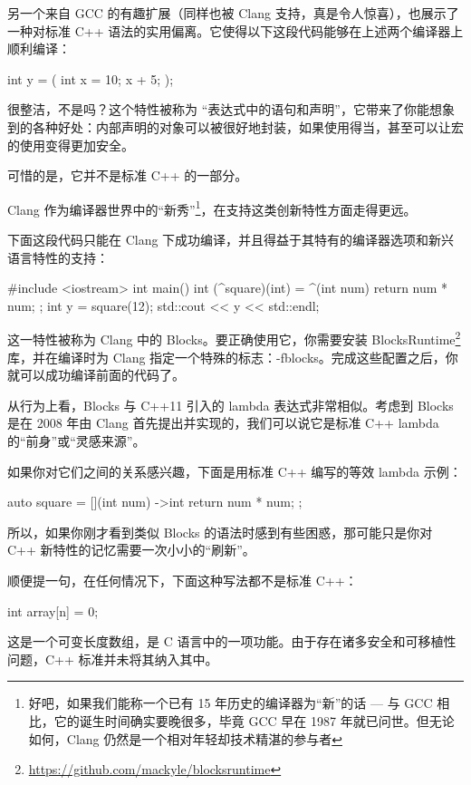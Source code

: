 另一个来自 GCC 的有趣扩展（同样也被 Clang 支持，真是令人惊喜），也展示了一种对标准 C++ 语法的实用偏离。它使得以下这段代码能够在上述两个编译器上顺利编译：

\begin{cpp}
int y = ({ int x = 10; x + 5; });
\end{cpp}

很整洁，不是吗？这个特性被称为 “表达式中的语句和声明”，它带来了你能想象到的各种好处：内部声明的对象可以被很好地封装，如果使用得当，甚至可以让宏的使用变得更加安全。

可惜的是，它并不是标准 C++ 的一部分。

Clang 作为编译器世界中的“新秀”\footnote{好吧，如果我们能称一个已有 15 年历史的编译器为“新”的话 --- 与 GCC 相比，它的诞生时间确实要晚很多，毕竟 GCC 早在 1987 年就已问世。但无论如何，Clang 仍然是一个相对年轻却技术精湛的参与者}，在支持这类创新特性方面走得更远。

下面这段代码只能在 Clang 下成功编译，并且得益于其特有的编译器选项和新兴语言特性的支持：

\begin{cpp}
#include <iostream>
int main() {
  int (^square)(int) = ^(int num) { return num * num; };
  int y = square(12);
  std::cout << y << std::endl;
}
\end{cpp}

这一特性被称为 Clang 中的 Blocks。要正确使用它，你需要安装 BlocksRuntime\footnote{\url{https://github.com/mackyle/blocksruntime}} 库，并在编译时为 Clang 指定一个特殊的标志：-fblocks。完成这些配置之后，你就可以成功编译前面的代码了。

从行为上看，Blocks 与 C++11 引入的 lambda 表达式非常相似。考虑到 Blocks 是在 2008 年由 Clang 首先提出并实现的，我们可以说它是标准 C++ lambda 的“前身”或“灵感来源”。

如果你对它们之间的关系感兴趣，下面是用标准 C++ 编写的等效 lambda 示例：

\begin{cpp}
auto square = [](int num) ->int { return num * num; };
\end{cpp}

所以，如果你刚才看到类似 Blocks 的语法时感到有些困惑，那可能只是你对 C++ 新特性的记忆需要一次小小的“刷新”。

顺便提一句，在任何情况下，下面这种写法都不是标准 C++：

\begin{cpp}
int array[n] = {0};
\end{cpp}

这是一个可变长度数组，是 C 语言中的一项功能。由于存在诸多安全和可移植性问题，C++ 标准并未将其纳入其中。

